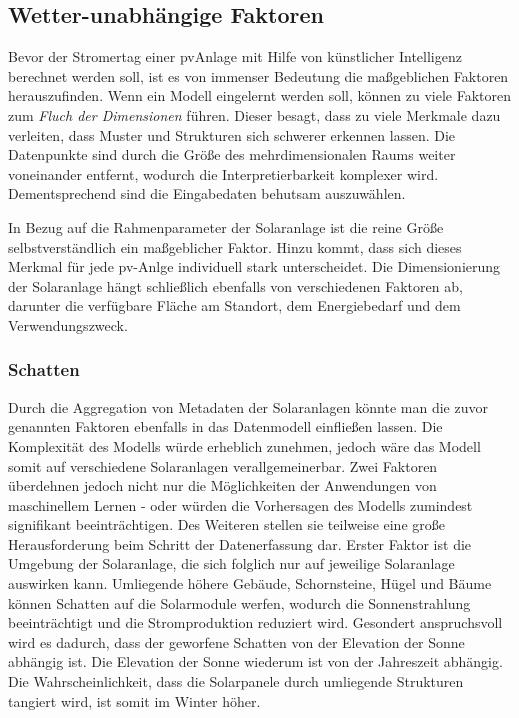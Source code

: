 \documentclass[12pt, a4paper]{article}
\begin{document}



\subsection{Wetter-unabhängige Faktoren}

Bevor der Stromertag einer \ac{pv}Anlage mit Hilfe von künstlicher Intelligenz berechnet werden soll, ist es von immenser Bedeutung die maßgeblichen Faktoren herauszufinden. Wenn ein Modell eingelernt werden soll, können zu viele Faktoren zum \textit{Fluch der Dimensionen} führen. Dieser besagt, dass zu viele Merkmale dazu verleiten, dass Muster und Strukturen sich schwerer erkennen lassen. Die Datenpunkte sind durch die Größe des mehrdimensionalen Raums weiter voneinander entfernt, wodurch die Interpretierbarkeit komplexer wird. Dementsprechend sind die Eingabedaten behutsam auszuwählen.

In Bezug auf die Rahmenparameter der Solaranlage ist die reine Größe selbstverständlich ein maßgeblicher Faktor. Hinzu kommt, dass sich dieses Merkmal für jede \ac{pv}-Anlge individuell stark unterscheidet. Die Dimensionierung der Solaranlage hängt schließlich ebenfalls von verschiedenen Faktoren ab, darunter die verfügbare Fläche am Standort, dem Energiebedarf und dem Verwendungszweck.

\subsubsection{Schatten}

Durch die Aggregation von Metadaten der Solaranlagen könnte man die zuvor genannten Faktoren ebenfalls in das Datenmodell einfließen lassen. Die Komplexität des Modells würde erheblich zunehmen, jedoch wäre das Modell somit auf verschiedene Solaranlagen verallgemeinerbar. Zwei Faktoren überdehnen jedoch nicht nur die Möglichkeiten der Anwendungen von maschinellem Lernen - oder würden die Vorhersagen des Modells zumindest signifikant beeinträchtigen. Des Weiteren stellen sie teilweise eine große Herausforderung beim Schritt der Datenerfassung dar. Erster Faktor ist die Umgebung der Solaranlage, die sich folglich nur auf jeweilige Solaranlage auswirken kann. Umliegende höhere Gebäude, Schornsteine, Hügel und Bäume können Schatten auf die Solarmodule werfen, wodurch die Sonnenstrahlung beeinträchtigt und die Stromproduktion reduziert wird. Gesondert anspruchsvoll wird es dadurch, dass der geworfene Schatten von der Elevation der Sonne abhängig ist. Die Elevation der Sonne wiederum ist von der Jahreszeit abhängig. Die Wahrscheinlichkeit, dass die Solarpanele durch umliegende Strukturen tangiert wird, ist somit im Winter höher. 
\end{document}

